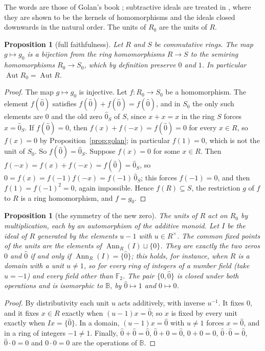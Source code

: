 \documentclass[11pt]{amsart}
\newtheorem{proposition}[thm]{Proposition}
\theoremstyle{remark}
\newcommand{\B}{\mathbb B}
\newcommand{\oz}{\widehat{0}}
\DeclareMathOperator{\Ann}{Ann}
\begin{document}
The words are those of Golan's book \cite{Golan}; subtractive ideals are treated in \cite[\S6.1]{FGJM}, where they are shown to be the kernels of homomorphisms and the ideals closed downwards in the natural order. The units of $R_0$ are the units of $R$.

\begin{proposition}[full faithfulness]\label{prop:ff}
Let $R$ and $S$ be commutative rings. The map $g\mapsto g_0$ is a bijection from the ring homomorphisms $R\to S$ to the semiring homomorphisms $R_0\to S_0$, which by definition preserve $0$ and $1$. In particular $\operatorname{Aut}R_0=\operatorname{Aut}R$.
\end{proposition}

\begin{proof}
The map $g\mapsto g_0$ is injective. Let $f\colon R_0\to S_0$ be a homomorphism. The element $f(\oz)$ satisfies $f(\oz)+f(\oz)=f(\oz)$, and in $S_0$ the only such elements are $0$ and the old zero $\oz_S$ of $S$, since $x+x=x$ in the ring $S$ forces $x=\oz_S$. If $f(\oz)=0$, then $f(x)+f(-x)=f(\oz)=0$ for every $x\in R$, so $f(x)=0$ by Proposition~\ref{prop:golan}; in particular $f(1)=0$, which is not the unit of $S_0$. So $f(\oz)=\oz_S$. Suppose $f(x)=0$ for some $x\in R$. Then $f(-x)=f(x)+f(-x)=f(\oz)=\oz_S$, so $0=f(x)=f(-1)f(-x)=f(-1)\,\oz_S$; this forces $f(-1)=0$, and then $f(1)=f(-1)^2=0$, again impossible. Hence $f(R)\subseteq S$, the restriction $g$ of $f$ to $R$ is a ring homomorphism, and $f=g_0$.
\end{proof}

\begin{proposition}[the symmetry of the new zero]\label{prop:fix}
The units of $R$ act on $R_0$ by multiplication, each by an automorphism of the additive monoid. Let $I$ be the ideal of $R$ generated by the elements $u-1$ with $u\in R^\times$. The common fixed points of the units are the elements of $\Ann_R(I)\sqcup\{0\}$. They are exactly the two zeros $0$ and $\oz$ if and only if $\Ann_R(I)=\{\oz\}$; this holds, for instance, when $R$ is a domain with a unit $u\neq1$, so for every ring of integers of a number field (take $u=-1$) and every field other than $\mathbb F_2$. The pair $\{0,\oz\}$ is closed under both operations and is isomorphic to $\B$, by $\oz\mapsto1$ and $0\mapsto0$.
\end{proposition}

\begin{proof}
By distributivity each unit $u$ acts additively, with inverse $u^{-1}$. It fixes $0$, and it fixes $x\in R$ exactly when $(u-1)x=\oz$; so $x$ is fixed by every unit exactly when $Ix=\{\oz\}$. In a domain, $(u-1)x=\oz$ with $u\neq1$ forces $x=\oz$, and in a ring of integers $-1\neq1$. Finally, $\oz+\oz=\oz$, $\oz+0=\oz$, $0+0=0$, $\oz\cdot\oz=\oz$, $\oz\cdot0=0$ and $0\cdot0=0$ are the operations of $\B$.
\end{proof}
\end{document}
